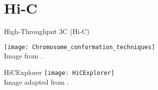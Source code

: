 \section{Hi-C}

\begin{frame}[c]{High-Throughput 3C (Hi-C)}
    \normalsize

\end{frame}

\begin{frame}[c]%
    \normalsize
    \texttt{[image: Chromosome\_conformation\_techniques]} \\
    Image from \cite{Li2014}.
\end{frame}


%  

\begin{frame}[c]{HiCExplorer}
    \normalsize
    \pause
    \texttt{[image: HiCExplorer]} \\
    Image adapted from \cite{wolff2018galaxy}.
\end{frame}



